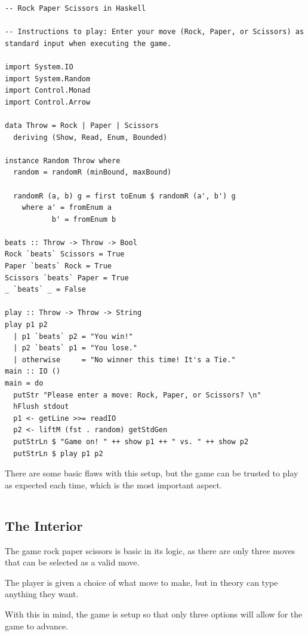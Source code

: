 \documentclass{article}
\begin{document}
\begin{lstlisting}
-- Rock Paper Scissors in Haskell 

-- Instructions to play: Enter your move (Rock, Paper, or Scissors) as standard input when executing the game.

import System.IO
import System.Random
import Control.Monad
import Control.Arrow

data Throw = Rock | Paper | Scissors
  deriving (Show, Read, Enum, Bounded)

instance Random Throw where
  random = randomR (minBound, maxBound)

  randomR (a, b) g = first toEnum $ randomR (a', b') g
    where a' = fromEnum a
           b' = fromEnum b

beats :: Throw -> Throw -> Bool
Rock `beats` Scissors = True
Paper `beats` Rock = True
Scissors `beats` Paper = True
_ `beats` _ = False

play :: Throw -> Throw -> String
play p1 p2
  | p1 `beats` p2 = "You win!"
  | p2 `beats` p1 = "You lose."
  | otherwise     = "No winner this time! It's a Tie."
main :: IO ()
main = do
  putStr "Please enter a move: Rock, Paper, or Scissors? \n"
  hFlush stdout
  p1 <- getLine >>= readIO
  p2 <- liftM (fst . random) getStdGen
  putStrLn $ "Game on! " ++ show p1 ++ " vs. " ++ show p2
  putStrLn $ play p1 p2
\end{lstlisting}

\medskip\noindent
There are some basic flaws with this setup, but the game can be trusted to play as expected each time, which is the most important aspect.

\medskip\medskip
\begin{lstlisting}
\end{lstlisting}

\medskip

\subsection{The Interior}
\medskip\medskip
\hspace{\parindent} 

\medskip\noindent
The game rock paper scissors is basic in its logic, as there are only three moves that can be selected as a valid move.

\medskip\noindent
The player is given a choice of what move to make, but in theory can type anything they want. 

\medskip\noindent
With this in mind, the game is setup so that only three options will allow for the game to advance.
\end{document}
